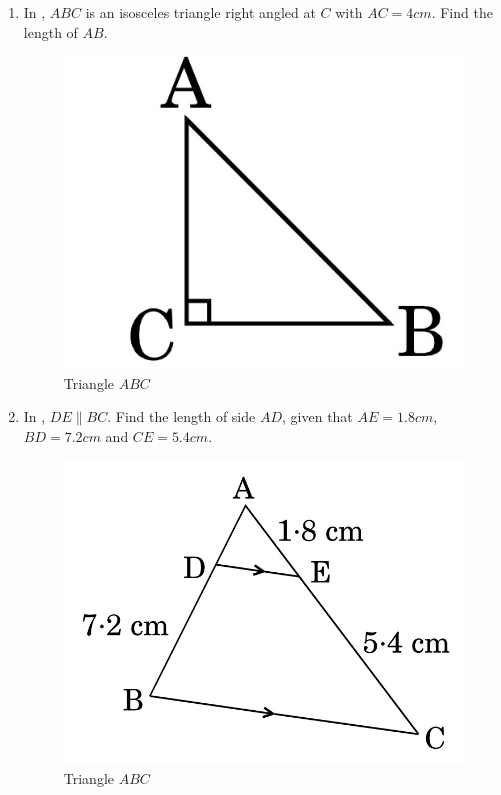\begin{enumerate}
\item In  , $ABC$ is an isosceles triangle right angled at $C$ with $AC = 4 cm$. Find the length of $AB$.
\begin{figure}[H]
    \centering
    \includegraphics[width=\columnwidth]{figs/img1.jpg}
    \caption{Triangle $ABC$}
    \label{fig:Figh_1}
\end{figure}

\item In  , $DE \parallel BC$. Find the length of side $AD$, given that $AE = 1.8 cm$, $ BD = 7.2 cm$ and $ CE = 5.4 cm$.
\begin{figure}[H]
    \centering
    \includegraphics[width=\columnwidth]{figs/img2.jpg}
    \caption{Triangle $ABC$ }
    \label{fig:Figh_2}
\end{figure}


\end{enumerate}
